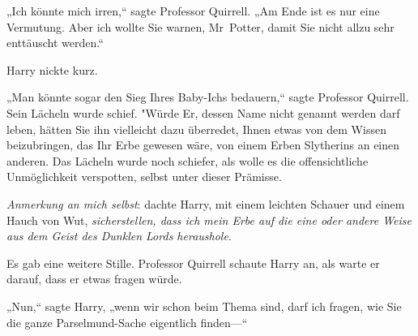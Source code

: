 „Ich könnte mich irren,“ sagte Professor Quirrell. „Am Ende ist es nur eine Vermutung. Aber ich wollte Sie warnen, Mr~Potter, damit Sie nicht allzu sehr enttäuscht werden.“

Harry nickte kurz.

„Man könnte sogar den Sieg Ihres Baby-Ichs bedauern,“ sagte Professor Quirrell. Sein Lächeln wurde schief. "Würde Er, dessen Name nicht genannt werden darf leben, hätten Sie ihn vielleicht dazu überredet, Ihnen etwas von dem Wissen beizubringen, das Ihr Erbe gewesen wäre, von einem Erben Slytherins an einen anderen. Das Lächeln wurde noch schiefer, als wolle es die offensichtliche Unmöglichkeit verspotten, selbst unter dieser Prämisse.

\emph{Anmerkung an mich selbst}: dachte Harry, mit einem leichten Schauer und einem Hauch von Wut, \emph{sicherstellen, dass ich mein Erbe auf die eine oder andere Weise aus dem Geist des Dunklen Lords heraushole}.

Es gab eine weitere Stille. Professor Quirrell schaute Harry an, als warte er darauf, dass er etwas fragen würde.

„Nun,“ sagte Harry, „wenn wir schon beim Thema sind, darf ich fragen, wie Sie die ganze Parselmund-Sache eigentlich finden—“

